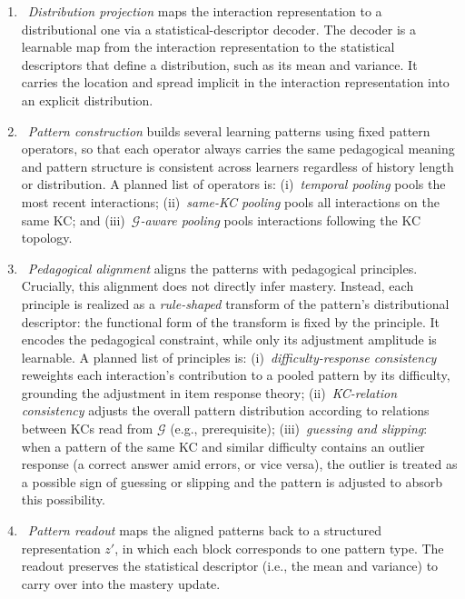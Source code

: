 \documentclass[conference]{IEEEtran}
\begin{document}
\begin{enumerate}
    \item~\emph{Distribution projection} maps the interaction representation to a distributional one via a statistical-descriptor decoder. The decoder is a learnable map from the interaction representation to the statistical descriptors that define a distribution, such as its mean and variance. It carries the location and spread implicit in the interaction representation into an explicit distribution.

    \item~\emph{Pattern construction} builds several learning patterns using fixed pattern operators, so that each operator always carries the same pedagogical meaning and pattern structure is consistent across learners regardless of history length or distribution. A planned list of operators is: (i)~\emph{temporal pooling} pools the most recent interactions; (ii)~\emph{same-KC pooling} pools all interactions on the same KC; and (iii)~\emph{$\mathcal{G}$-aware pooling} pools interactions following the KC topology.

    \item~\emph{Pedagogical alignment} aligns the patterns with pedagogical principles. Crucially, this alignment does not directly infer mastery. Instead, each principle is realized as a \emph{rule-shaped} transform of the pattern's distributional descriptor: the functional form of the transform is fixed by the principle. It encodes the pedagogical constraint, while only its adjustment amplitude is learnable. A planned list of principles is: (i)~\emph{difficulty-response consistency} reweights each interaction's contribution to a pooled pattern by its difficulty, grounding the adjustment in item response theory; (ii)~\emph{KC-relation consistency} adjusts the overall pattern distribution according to relations between KCs read from $\mathcal{G}$ (e.g., prerequisite); (iii)~\emph{guessing and slipping}: when a pattern of the same KC and similar difficulty contains an outlier response (a correct answer amid errors, or vice versa), the outlier is treated as a possible sign of guessing or slipping and the pattern is adjusted to absorb this possibility.

    \item~\emph{Pattern readout} maps the aligned patterns back to a structured representation $z'$, in which each block corresponds to one pattern type. The readout preserves the statistical descriptor (i.e., the mean and variance) to carry over into the mastery update.
\end{enumerate}
\end{document}
